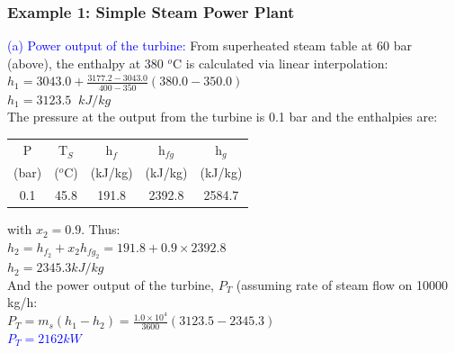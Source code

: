 \documentclass[10pt,compress]{beamer}
\begin{document}
\begin{frame}
 \frametitle{Example 1: Simple Steam Power Plant}

    \textcolor{blue}{(a) Power output of the turbine:} From superheated steam table at 60 bar (above), the enthalpy at 380 $^{o}$C is calculated via linear interpolation:\\
        $h_{1}=3043.0 + \displaystyle\frac{3177.2-3043.0}{400-350}\left(380.0-350.0\right)$\\
        $h_{1}=3123.5\;\;kJ/kg$ \\
 
    The pressure at the output from the turbine is 0.1 bar and the enthalpies are:\\
\begin{center}
    \begin{tabular}{|c c c c c|}
     \hline
     P    & T$_{S}$  & h$_{f}$  & h$_{fg}$ & h$_{g}$ \\
    (bar) & ($^{o}$C) & (kJ/kg) & (kJ/kg) & (kJ/kg) \\
    \hline
     0.1 &  45.8     & 191.8   & 2392.8  & 2584.7 \\
    \hline 
    \end{tabular}
\end{center}

    with $x_{2}=0.9$. Thus:\\
    $h_{2}=h_{f_{2}}+x_{2}h_{fg_{2}} = 191.8 + 0.9\times 2392.8$\\
    $h_{2}=2345.3 kJ/kg$\\
    And the power output of the turbine, $P_{T}$ (assuming rate of steam flow on 10000 kg/h:\\
    $P_{T}=m_{s}\left(h_{1}-h_{2}\right)=\displaystyle\frac{1.0\times 10^{4}}{3600}\left(3123.5-2345.3\right)$\\
    \textcolor{blue}{$P_{T}=2162 kW$}

 \normalsize
\end{frame}
\end{document}
